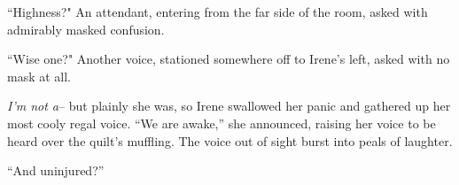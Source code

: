 \documentclass[../FGP.tex]{subfiles}
\begin{document}
\begin{fragment}
``Highness?" An attendant, entering from the far side of the room, asked with admirably masked confusion.

``Wise one?" Another voice, stationed somewhere off to Irene's left, asked with no mask at all.

\emph{I'm not a}-- but plainly she was, so Irene swallowed her panic and gathered up her most cooly regal voice. ``We are awake,'' she announced, raising her voice to be heard over the quilt's muffling. The voice out of sight burst into peals of laughter. 

``And uninjured?'' 


















\end{fragment}
\end{document}

